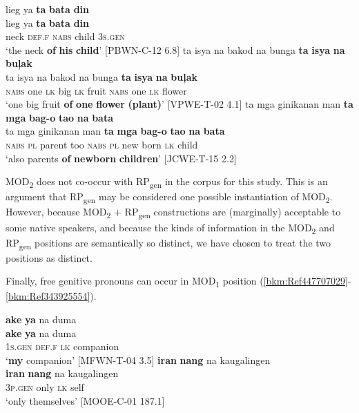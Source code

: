 \ea
\label{bkm:Ref447702935}
lieg  ya  \textbf{ta}  \textbf{bata}  \textbf{din} \\\smallskip
 \gll lieg  ya  \textbf{ta}  \textbf{bata}  \textbf{din} \\
neck  \textsc{def.f}  \textsc{nabs}  child  3\textsc{s.gen} \\
\glt ‘the neck \textbf{of} \textbf{his} \textbf{child}’ [PBWN-C-12 6.8]
\z
\ea
ta  isya  na  bakod  na  bunga  \textbf{ta}  \textbf{isya}  \textbf{na}  \textbf{buļak} \\\smallskip
 \gll ta  isya  na  bakod  na  bunga  \textbf{ta}  \textbf{isya}  \textbf{na}  \textbf{buļak} \\
\textsc{nabs}  one  \textsc{lk}  big  \textsc{lk}  fruit  \textsc{nabs}  one  \textsc{lk}  flower \\
\glt ‘one big fruit \textbf{of} \textbf{one} \textbf{flower} \textbf{(plant)}’ [VPWE-T-02 4.1]
\z
\ea
\label{bkm:Ref363473619}
ta  mga  ginikanan  man  \textbf{ta}  \textbf{mga}  \textbf{bag-o}  \textbf{tao}  \textbf{na}  \textbf{bata} \\\smallskip
 \gll ta  mga  ginikanan  man  \textbf{ta}  \textbf{mga}  \textbf{bag-o}  \textbf{tao}  \textbf{na}  \textbf{bata} \\
\textsc{nabs}  \textsc{pl}  parent  too  \textsc{nabs}  \textsc{pl}  new  born  \textsc{lk}  child \\
\glt ‘also parents \textbf{of} \textbf{newborn} \textbf{children}’ [JCWE-T-15 2.2]
\z

MOD\textsubscript{2} does not co-occur with RP\textsubscript{gen} in the corpus for this study. This is an argument that RP\textsubscript{gen} may be considered one possible instantiation of MOD\textsubscript{2}. However, because MOD\textsubscript{2} + RP\textsubscript{gen} constructions are (marginally) acceptable to some native speakers, and because the kinds of information in the MOD\textsubscript{2} and RP\textsubscript{gen} positions are semantically so distinct, we have chosen to treat the two positions as distinct.

Finally, free genitive pronouns can occur in MOD\textsubscript{1} position (\ref{bkm:Ref447707029}{}-\ref{bkm:Ref343925554}).


\ea
\label{bkm:Ref447707029}
\textbf{ake}  \textbf{ya}  na  duma \\\smallskip
 \gll \textbf{ake}  \textbf{ya}  na  duma \\
1\textsc{s.gen}  \textsc{def.f}  \textsc{lk}  companion \\
\glt ‘\textbf{my} companion’ [MFWN-T-04 3.5]
\z
\ea
\textbf{iran}  \textbf{nang}  na  kaugalingen \\\smallskip
 \gll \textbf{iran}  \textbf{nang}  na  kaugalingen \\
3\textsc{p.gen}  only  \textsc{lk}  self \\
\glt ‘only themselves’ [MOOE-C-01 187.1]
\z

